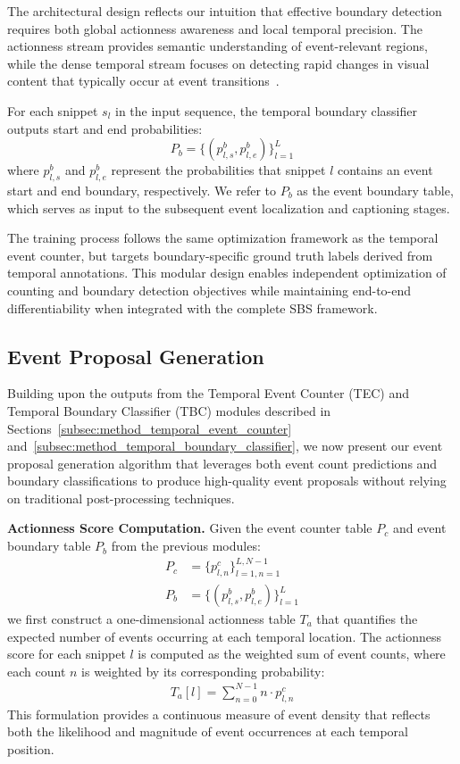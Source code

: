 The architectural design reflects our intuition that effective boundary detection requires both global actionness awareness and local temporal precision. The actionness stream provides semantic understanding of event-relevant regions, while the dense temporal stream focuses on detecting rapid changes in visual content that typically occur at event transitions~\cite{long2019gaussian,yuan2017temporal}. 

For each snippet $s_l$ in the input sequence, the temporal boundary classifier outputs start and end probabilities:
$$P_b = \{(p_{l,s}^b, p_{l,e}^b)\}_{l=1}^{L}$$
where $p_{l,s}^b$ and $p_{l,e}^b$ represent the probabilities that snippet $l$ contains an event start and end boundary, respectively. We refer to $P_b$ as the event boundary table, which serves as input to the subsequent event localization and captioning stages.

The training process follows the same optimization framework as the temporal event counter, but targets boundary-specific ground truth labels derived from temporal annotations. This modular design enables independent optimization of counting and boundary detection objectives while maintaining end-to-end differentiability when integrated with the complete SBS framework.

\subsection{Event Proposal Generation}%
\label{subsec:method_event_proposal_generation}

Building upon the outputs from the Temporal Event Counter (TEC) and Temporal Boundary Classifier (TBC) modules described in Sections~\ref{subsec:method_temporal_event_counter} and~\ref{subsec:method_temporal_boundary_classifier}, we now present our event proposal generation algorithm that leverages both event count predictions and boundary classifications to produce high-quality event proposals without relying on traditional post-processing techniques.

\textbf{Actionness Score Computation.}
Given the event counter table $P_c$ and event boundary table $P_b$ from the previous modules:
\begin{align}
  P_c &= \{p_{l,n}^c\}_{l=1,n=1}^{L, N-1} \\
  P_b &= \{(p_{l,s}^b, p_{l,e}^b)\}_{l=1}^{L}
\end{align}
we first construct a one-dimensional actionness table $T_a$ that quantifies the expected number of events occurring at each temporal location. The actionness score for each snippet $l$ is computed as the weighted sum of event counts, where each count $n$ is weighted by its corresponding probability:
\begin{align}
  T_{a}[l] = \sum_{n=0}^{N-1} n \cdot p_{l,n}^c
\end{align}
This formulation provides a continuous measure of event density that reflects both the likelihood and magnitude of event occurrences at each temporal position.

